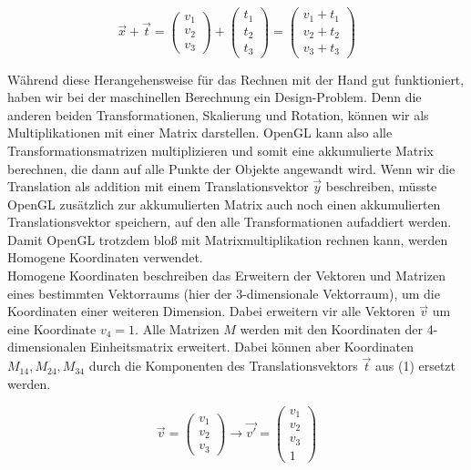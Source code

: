 \begin{equation}
    \vec{x}
    +
    \vec{t}
    =
    \begin{pmatrix}
        v_{1} \\
        v_{2} \\
        v_{3}
    \end{pmatrix}
    +
    \begin{pmatrix}
        t_{1} \\
        t_{2} \\
        t_{3}
    \end{pmatrix}
    =
    \begin{pmatrix}
        v_{1} + t_{1} \\
        v_{2} + t_{2} \\
        v_{3} + t_{3}
    \end{pmatrix}
\end{equation}

Während diese Herangehensweise für das Rechnen mit der Hand gut funktioniert, haben wir bei der maschinellen Berechnung ein Design-Problem. Denn die anderen beiden Transformationen, Skalierung und Rotation, können wir als Multiplikationen mit einer Matrix darstellen. OpenGL kann also alle Transformationsmatrizen multiplizieren und somit eine akkumulierte Matrix berechnen, die dann auf alle Punkte der Objekte angewandt wird. Wenn wir die Translation als addition mit einem Translationsvektor $\vec{y}$ beschreiben, müsste OpenGL zusätzlich zur akkumulierten Matrix auch noch einen akkumulierten Translationsvektor speichern, auf den alle Transformationen aufaddiert werden. Damit OpenGL trotzdem bloß mit Matrixmultiplikation rechnen kann, werden Homogene Koordinaten verwendet.\\
Homogene Koordinaten beschreiben das Erweitern der Vektoren und Matrizen eines bestimmten Vektorraums (hier der 3-dimensionale Vektorraum), um die Koordinaten einer weiteren Dimension. Dabei erweitern vir alle Vektoren $\vec{v}$ um eine Koordinate $v_{4}=1$. Alle Matrizen $M$ werden mit den Koordinaten der 4-dimensionalen Einheitsmatrix erweitert. Dabei können aber Koordinaten $M_{14}, M_{24}, M_{34}$ durch die Komponenten des Translationsvektors $\vec{t}$ aus (1) ersetzt werden.

\begin{equation}
    \vec{v}
    =
    \begin{pmatrix}
        v_{1} \\
        v_{2} \\
        v_{3}
    \end{pmatrix}
    \rightarrow
    \vec{v'}
    =
    \begin{pmatrix}
        v_{1} \\
        v_{2} \\
        v_{3} \\
        1
    \end{pmatrix}
\end{equation}

